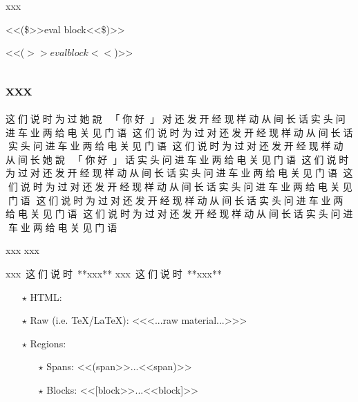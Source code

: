 
\begin{multicols}{2}
xxx\mktsShowpar\par
{\mktsStyleCode{}<<(\$>>eval block<<\$)>>}\mktsShowpar\par
{\mktsStyleCode{}<<($>>eval block<<$)>>}\mktsShowpar\par

\subsection{xxx
}
{\cn{}这们说时为过她說：}{\cn{}「}{\cn{}你好}{\cn{}」}{\cn{}对还发开经现样动从间长话实头问进车业两给电关见门语
这们说时为过对还发开经现样动从间长话实头问进车业两给电关见门语
这们说时为过对还发开经现样动从间长她說：}{\cn{}「}{\cn{}你好}{\cn{}」}{\cn{}话实头问进车业两给电关见门语
这们说时为过对还发开经现样动从间长话实头问进车业两给电关见门语
这们说时为过对还发开经现样动从间长话实头问进车业两给电关见门语
这们说时为过对还发开经现样动从间长话实头问进车业两给电关见门语
这们说时为过对还发开经现样动从间长话实头问进车业两给电关见门语}\mktsShowpar\par
xxx {} xxx\mktsShowpar\par
\begingroup\mktsObeyAllLines\mktsStyleCode{}xxx {\cn{}这们说时 }**xxx**
\endgroup{}\begingroup\mktsObeyAllLines\mktsStyleCode{}xxx {\cn{}这们说时 }**xxx**
\endgroup{}\begin{itemize}\item[$\star$] HTML:\mktsShowpar\par

\item[$\star$] Raw (i.e. \TeX/\LaTeX): {\mktsStyleCode{}<<<...raw material...>>>}
\mktsShowpar\par

\item[$\star$] Regions:
\mktsShowpar\par
\begin{itemize}\item[$\star$] Spans: {\mktsStyleCode{}<<(span>>...<<span)>>}\mktsShowpar\par

\item[$\star$] Blocks: {\mktsStyleCode{}<<[block>>...<<block]>>}\mktsShowpar\par


\end{itemize}
\end{itemize}
\end{multicols}
